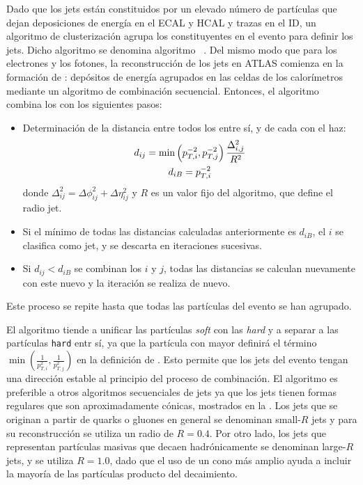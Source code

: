 Dado que los jets están constituidos por un elevado número de partículas que dejan deposiciones de energía en el \ac{ECAL} y \ac{HCAL} y trazas en el \ac{ID}, un algoritmo de clusterizaci\'on agrupa los constituyentes en el evento para definir los jets. Dicho algoritmo se denomina algoritmo \antikt~\cite{AntiKtAlgorithm}. Del mismo modo que para los electrones y los fotones, la reconstrucción de los jets en \ac{ATLAS} comienza en la formación de \topos: depósitos de energía agrupados en las celdas de los calorímetros mediante un algoritmo de combinación secuencial. Entonces, el algoritmo \antikt combina los \topos con los siguientes pasos:
\begin{itemize}
    \item Determinaci\'on de la distancia entre todos los \topos entre sí, y de cada \topo con el haz:
        \begin{gather}
            d_{ij} = \min \left( p_{T,i}^{-2}, p_{T,j}^{-2} \right) \frac{\Delta_{i,j}^2}{R^2}\\
            d_{iB} = p_{T,i}^{-2}
        \end{gather}
        donde \(\Delta_{ij}^2 = \Delta\phi_{ij}^2 + \Delta\eta_{ij}^2\) y \(R\) es un valor fijo del algoritmo, que define el radio jet.
    \item Si el mínimo de todas las distancias calculadas anteriormente es \(d_{iB}\), el \topo \(i\) se clasifica como jet, y se descarta en iteraciones sucesivas.
    \item Si \(d_{ij} < d_{iB}\) se combinan los \topos \(i\) y \(j\), todas las distancias se calculan nuevamente con este nuevo \topo y la iteración se realiza de nuevo.
\end{itemize}
Este proceso se repite hasta que todas las partículas del evento se han agrupado.

El algoritmo \antikt tiende a unificar las part\'iculas \textit{soft} con las \textit{hard} y a separar a las part\'iculas \texttt{hard} entr s\'i, ya que la partícula con mayor \pt definirá el término \(\min \left( \frac{1}{p_{T,i}^2}, \frac{1}{p_{T,j}^2}  \right)\) en la definición de \dij. Esto permite que los jets del evento tengan una dirección estable al principio del proceso de combinación. El algoritmo \antikt es preferible a otros algoritmos secuenciales de jets ya que los jets tienen formas regulares que son aproximadamente cónicas, mostrados en la \Fig{\ref{fig:objects:jets:antikt}}. Los jets que se originan a partir de quarks o gluones en general se denominan small-\(R\) jets y para su reconstrucción se utiliza un radio de \(R=0.4\). Por otro lado, los jets que representan partículas masivas que decaen hadrónicamente se denominan large-\(R\) jets, y se utiliza \(R=1.0\), dado que el uso de un cono más amplio ayuda a incluir la mayoría de las partículas producto del decaimiento.


